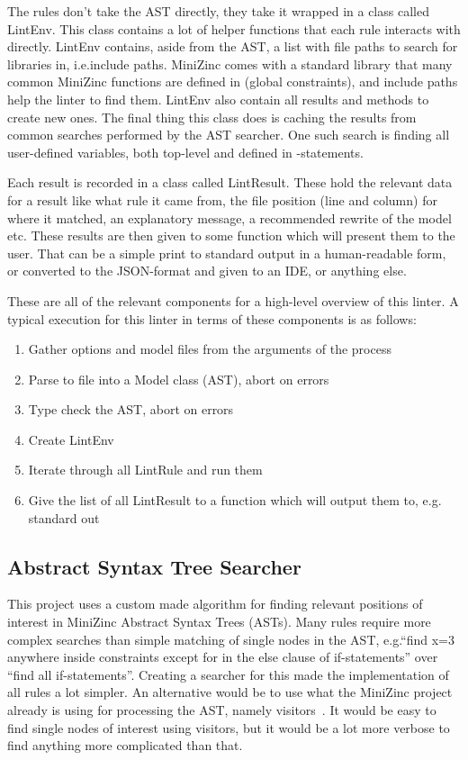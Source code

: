 \documentclass[a4paper,12pt]{article}
\newcommand{\mi}[1]{\mbox{\mzninline{#1}}}
\newcommand{\cpp}[1]{\mbox{\mznfont #1}}
\begin{document}
\begin{sloppypar}
The rules don't take the AST directly, they take it wrapped in a class called
\cpp{LintEnv}. This class contains a lot of helper functions that each rule interacts with
directly. \cpp{LintEnv} contains, aside from the AST, a list with file paths to search for
libraries in, i.e.\@ include paths. MiniZinc comes with a standard library that many
common MiniZinc functions are defined in (global constraints), and include paths help the linter to find them.
\cpp{LintEnv} also contain all results and methods to create new ones. The final thing
this class does is caching the results from common searches performed by the AST searcher.
One such search is finding all user-defined
variables, both top-level and defined in \mi{let}-statements.
\end{sloppypar}

Each result is recorded in a class called \cpp{LintResult}. These hold the relevant data
for a result like what rule it came from, the file position (line and column) for where it
matched, an explanatory message, a recommended rewrite of the model etc. These results are
then given to some function which will present them to the user. That can be a simple
print to standard output in a human-readable form, or converted to the JSON-format and
given to an IDE, or anything else.

These are all of the relevant components for a high-level overview of this linter. A
typical execution for this linter in terms of these components is as follows:
\begin{enumerate}
  \item Gather options and model files from the arguments of the process
  \item Parse to file into a \cpp{Model} class (AST), abort on errors
  \item Type check the AST, abort on errors
  \item Create \cpp{LintEnv}
  \item Iterate through all \cpp{LintRule} and run them
  \item Give the list of all \cpp{LintResult} to a function which will output them to, e.g.\@
  standard out
\end{enumerate}

\subsection{Abstract Syntax Tree Searcher}\label{sec:searcher}
This project uses a custom made algorithm for finding relevant positions of interest in
MiniZinc Abstract Syntax Trees (ASTs). Many rules require more complex searches than
simple matching of single nodes in the AST, e.g.\@ ``find x=3 anywhere inside constraints
except for in the else clause of if-statements'' over ``find all if-statements''. Creating
a searcher for this made the implementation of all rules a lot simpler. An alternative
would be to use what the MiniZinc project already is using for processing the AST, namely
visitors~\cite{DesignPatterns94}. It would be easy to find single nodes of interest using
visitors, but it would be a lot more verbose to find anything more complicated than that.
\end{document}
